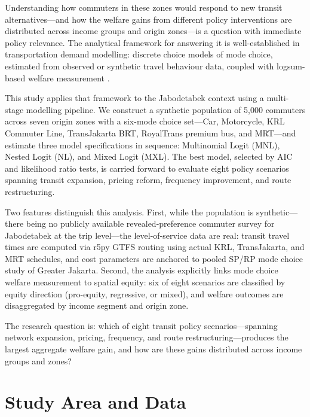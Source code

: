 \documentclass[12pt,a4paper]{article}
\begin{document}
Understanding how commuters in these zones would respond to new transit alternatives---and how the welfare gains from different policy interventions are distributed across income groups and origin zones---is a question with immediate policy relevance. The analytical framework for answering it is well-established in transportation demand modelling: discrete choice models of mode choice, estimated from observed or synthetic travel behaviour data, coupled with logsum-based welfare measurement \citep{benakiva1985,train2009}.

This study applies that framework to the Jabodetabek context using a multi-stage modelling pipeline. We construct a synthetic population of 5,000 commuters across seven origin zones with a six-mode choice set---Car, Motorcycle, KRL Commuter Line, TransJakarta BRT, RoyalTrans premium bus, and MRT---and estimate three model specifications in sequence: Multinomial Logit (MNL), Nested Logit (NL), and Mixed Logit (MXL). The best model, selected by AIC and likelihood ratio tests, is carried forward to evaluate eight policy scenarios spanning transit expansion, pricing reform, frequency improvement, and route restructuring.

Two features distinguish this analysis. First, while the population is synthetic---there being no publicly available revealed-preference commuter survey for Jabodetabek at the trip level---the level-of-service data are real: transit travel times are computed via r5py GTFS routing using actual KRL, TransJakarta, and MRT schedules, and cost parameters are anchored to \citet{ilahi2021} pooled SP/RP mode choice study of Greater Jakarta. Second, the analysis explicitly links mode choice welfare measurement to spatial equity: six of eight scenarios are classified by equity direction (pro-equity, regressive, or mixed), and welfare outcomes are disaggregated by income segment and origin zone.

The research question is: which of eight transit policy scenarios---spanning network expansion, pricing, frequency, and route restructuring---produces the largest aggregate welfare gain, and how are these gains distributed across income groups and zones?

\section{Study Area and Data}
\end{document}

